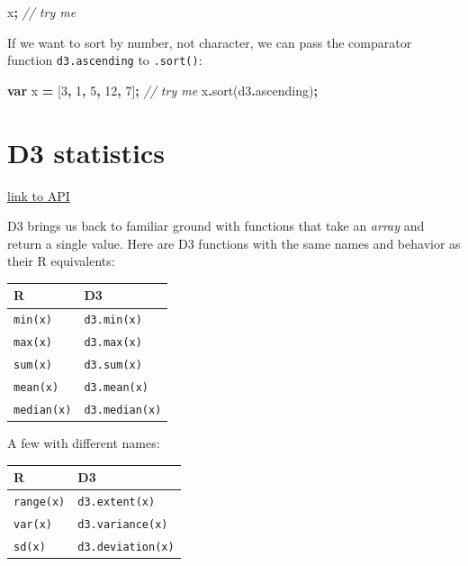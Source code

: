 \documentclass[
  openany]{book}
\newenvironment{Shaded}{\begin{snugshade}}{\end{snugshade}}
\newcommand{\AttributeTok}[1]{\textcolor[rgb]{0.77,0.63,0.00}{#1}}
\newcommand{\CommentTok}[1]{\textcolor[rgb]{0.56,0.35,0.01}{\textit{#1}}}
\newcommand{\DecValTok}[1]{\textcolor[rgb]{0.00,0.00,0.81}{#1}}
\newcommand{\FunctionTok}[1]{\textcolor[rgb]{0.00,0.00,0.00}{#1}}
\newcommand{\KeywordTok}[1]{\textcolor[rgb]{0.13,0.29,0.53}{\textbf{#1}}}
\newcommand{\NormalTok}[1]{#1}
\newcommand{\OperatorTok}[1]{\textcolor[rgb]{0.81,0.36,0.00}{\textbf{#1}}}
\begin{document}
\begin{Shaded}
\begin{Highlighting}[]
\NormalTok{x}\OperatorTok{;}     \CommentTok{// try me}
\end{Highlighting}
\end{Shaded}

If we want to sort by number, not character, we can pass the comparator function \texttt{d3.ascending} to \texttt{.sort()}:

\begin{Shaded}
\begin{Highlighting}[]
\KeywordTok{var}\NormalTok{ x }\OperatorTok{=}\NormalTok{ [}\DecValTok{3}\OperatorTok{,} \DecValTok{1}\OperatorTok{,} \DecValTok{5}\OperatorTok{,} \DecValTok{12}\OperatorTok{,} \DecValTok{7}\NormalTok{]}\OperatorTok{;}     \CommentTok{// try me}
\NormalTok{x}\OperatorTok{.}\FunctionTok{sort}\NormalTok{(d3}\OperatorTok{.}\AttributeTok{ascending}\NormalTok{)}\OperatorTok{;}
\end{Highlighting}
\end{Shaded}

\hypertarget{d3-statistics}{%
\section{D3 statistics}\label{d3-statistics}}

\href{https://github.com/d3/d3-array/blob/v1.2.4/README.md\#statistics}{link to API}

D3 brings us back to familiar ground with functions that take an \emph{array} and return a single value. Here are D3 functions with the same names and behavior as their R equivalents:

\begin{longtable}[]{@{}ll@{}}
\toprule
R & D3\tabularnewline
\midrule
\endhead
\texttt{min(x)} & \texttt{d3.min(x)}\tabularnewline
\texttt{max(x)} & \texttt{d3.max(x)}\tabularnewline
\texttt{sum(x)} & \texttt{d3.sum(x)}\tabularnewline
\texttt{mean(x)} & \texttt{d3.mean(x)}\tabularnewline
\texttt{median(x)} & \texttt{d3.median(x)}\tabularnewline
\bottomrule
\end{longtable}

A few with different names:

\begin{longtable}[]{@{}ll@{}}
\toprule
R & D3\tabularnewline
\midrule
\endhead
\texttt{range(x)} & \texttt{d3.extent(x)}\tabularnewline
\texttt{var(x)} & \texttt{d3.variance(x)}\tabularnewline
\texttt{sd(x)} & \texttt{d3.deviation(x)}\tabularnewline
\bottomrule
\end{longtable}
\end{document}
